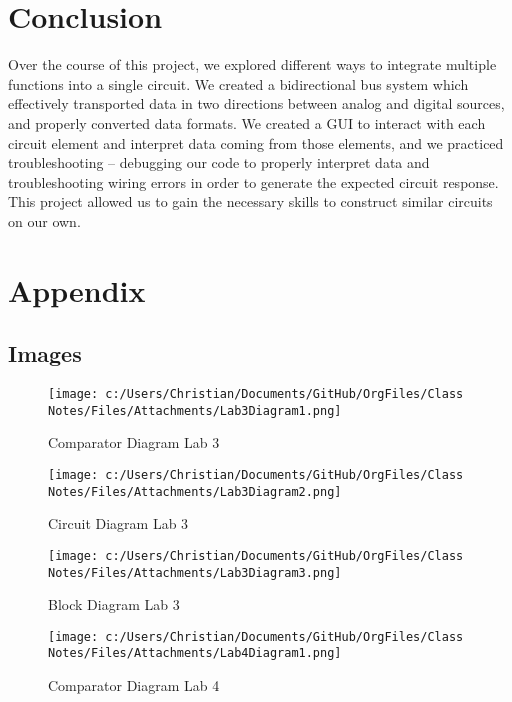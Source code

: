 \documentclass[11pt]{article}
\begin{document}
\section{Conclusion}
\label{sec:orgd73ace5}
Over the course of this project, we explored different ways to integrate multiple functions into a single circuit. We created a bidirectional bus system which effectively transported data in two directions between analog and digital sources, and properly converted data formats. We created a GUI to interact with each circuit element and interpret data coming from those elements, and we practiced troubleshooting – debugging our code to properly interpret data and troubleshooting wiring errors in order to generate the expected circuit response. This project allowed us to gain the necessary skills to construct similar circuits on our own.

\clearpage
\section{Appendix}
\label{sec:orgd8b942e}

\subsection{Images}
\label{sec:org4c34073}

\begin{figure}[htbp]
\centering
\texttt{[image: c:/Users/Christian/Documents/GitHub/OrgFiles/Class Notes/Files/Attachments/Lab3Diagram1.png]}
\caption{Comparator Diagram Lab 3}
\end{figure}

\begin{figure}[htbp]
\centering
\texttt{[image: c:/Users/Christian/Documents/GitHub/OrgFiles/Class Notes/Files/Attachments/Lab3Diagram2.png]}
\caption{Circuit Diagram Lab 3}
\end{figure}

\begin{figure}[htbp]
\centering
\texttt{[image: c:/Users/Christian/Documents/GitHub/OrgFiles/Class Notes/Files/Attachments/Lab3Diagram3.png]}
\caption{Block Diagram Lab 3}
\end{figure}

\begin{figure}[htbp]
\centering
\texttt{[image: c:/Users/Christian/Documents/GitHub/OrgFiles/Class Notes/Files/Attachments/Lab4Diagram1.png]}
\caption{Comparator Diagram Lab 4}
\end{figure}
\end{document}
